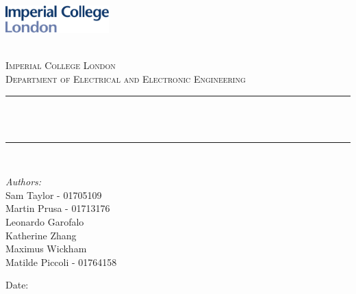 \begin{titlepage}

\newcommand{\HRule}{\rule{\linewidth}{0.5mm}} %



\includegraphics[width = 4cm]{./figures/imperial}\\[0.5cm] 

\begin{center} %

\textsc{\LARGE \reporttype}\\[1.5cm] 
\textsc{\Large Imperial College London}\\[0.5cm] 
\textsc{\large Department of Electrical and Electronic Engineering}\\[0.5cm] 

\HRule \\[0.4cm]
{ \huge \bfseries \reporttitle}\\ %
\HRule \\[1.5cm]
\end{center}

\begin{center}
\textit{Authors:}\\
Sam Taylor - 01705109\\
Martin Prusa - 01713176\\
Leonardo Garofalo \\
Katherine Zhang \\
Maximus Wickham \\
Matilde Piccoli - 01764158 \\
\end{center}
\vspace{2cm}
\makeatletter
\centering
Date: \@date 

\vfill %



\makeatother


\end{titlepage}


